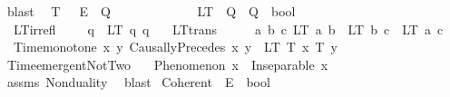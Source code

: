 \begin{isabellebody}
\ blast%
\endisatagproof
{\isafoldproof}%
%
\isadelimproof
%
\endisadelimproof
%
\isadelimdocument
%
\endisadelimdocument
%
\isatagdocument
%
\isamarkuptrue%
%
\endisatagdocument
{\isafolddocument}%
%
\isadelimdocument
%
\endisadelimdocument
{}\isamarkupfalse%
\isanewline
\ \ T\ \ {\isacharcolon}{\kern0pt}{\isacharcolon}{\kern0pt}\ {\isachardoublequoteopen}E\ {\isasymRightarrow}\ Q{\isachardoublequoteclose}\ \ \ \ \ \ \ \ \ \ \ \isanewline
\ \ LT\ {\isacharcolon}{\kern0pt}{\isacharcolon}{\kern0pt}\ {\isachardoublequoteopen}Q\ {\isasymRightarrow}\ Q\ {\isasymRightarrow}\ bool{\isachardoublequoteclose}\ \ \ \isanewline
\isanewline
{}\isamarkupfalse%
\ \isanewline
\ \ LT{\isacharunderscore}{\kern0pt}irrefl{\isacharcolon}{\kern0pt}\ \ \ \ \ {\isachardoublequoteopen}{\isasymforall}q{\isachardot}{\kern0pt}\ {\isasymnot}\ LT\ q\ q{\isachardoublequoteclose}\ \isanewline
\ \ LT{\isacharunderscore}{\kern0pt}trans{\isacharcolon}{\kern0pt}\ \ \ \ \ \ {\isachardoublequoteopen}{\isasymforall}a\ b\ c{\isachardot}{\kern0pt}\ LT\ a\ b\ {\isasymand}\ LT\ b\ c\ {\isasymlongrightarrow}\ LT\ a\ c{\isachardoublequoteclose}\ \isanewline
\ \ Time{\isacharunderscore}{\kern0pt}monotone{\isacharcolon}{\kern0pt}\ {\isachardoublequoteopen}{\isasymforall}x\ y{\isachardot}{\kern0pt}\ CausallyPrecedes\ x\ y\ {\isasymlongrightarrow}\ LT\ {\isacharparenleft}{\kern0pt}T\ x{\isacharparenright}{\kern0pt}\ {\isacharparenleft}{\kern0pt}T\ y{\isacharparenright}{\kern0pt}{\isachardoublequoteclose}\isanewline
\isanewline
{}\isamarkupfalse%
\ Time{\isacharunderscore}{\kern0pt}emergent{\isacharunderscore}{\kern0pt}NotTwo{\isacharcolon}{\kern0pt}\isanewline
\ \ \ {\isachardoublequoteopen}Phenomenon\ x{\isachardoublequoteclose}\ \ {\isachardoublequoteopen}Inseparable\ x\ {\isasymOmega}{\isachardoublequoteclose}\isanewline
%
\isadelimproof
\ \ %
\endisadelimproof
%
\isatagproof
{}\isamarkupfalse%
\ assms\ Nonduality\ \isamarkupfalse%
\ blast%
\endisatagproof
{\isafoldproof}%
%
\isadelimproof
%
\endisadelimproof
%
\isadelimdocument
%
\endisadelimdocument
%
\isatagdocument
%
\isamarkuptrue%
%
\endisatagdocument
{\isafolddocument}%
%
\isadelimdocument
%
\endisadelimdocument
{}\isamarkupfalse%
\ Coherent\ {\isacharcolon}{\kern0pt}{\isacharcolon}{\kern0pt}\ {\isachardoublequoteopen}E\ {\isasymRightarrow}\ bool{\isachardoublequoteclose}\isanewline

\end{isabellebody}
